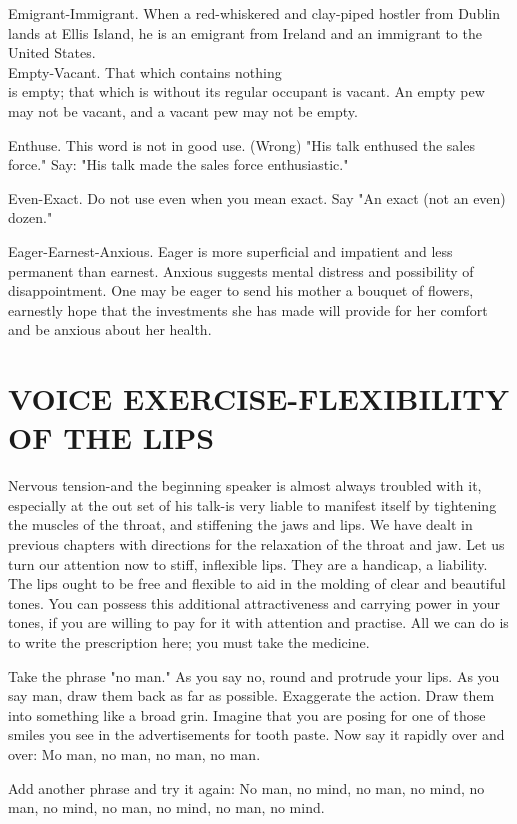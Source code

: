 \documentclass[10pt]{article}
\begin{document}
Emigrant-Immigrant. When a red-whiskered and clay-piped hostler from Dublin lands at Ellis Island, he is an emigrant from Ireland and an immigrant to the United States.\\
Empty-Vacant. That which contains nothing\\
is empty; that which is without its regular occupant is vacant. An empty pew may not be vacant, and a vacant pew may not be empty.

Enthuse. This word is not in good use. (Wrong) "His talk enthused the sales force." Say: "His talk made the sales force enthusiastic."

Even-Exact. Do not use even when you mean exact. Say "An exact (not an even) dozen."

Eager-Earnest-Anxious. Eager is more superficial and impatient and less permanent than earnest. Anxious suggests mental distress and possibility of disappointment. One may be eager to send his mother a bouquet of flowers, earnestly hope that the investments she has made will provide for her comfort and be anxious about her health.

\section*{VOICE EXERCISE-FLEXIBILITY OF THE LIPS}
Nervous tension-and the beginning speaker is almost always troubled with it, especially at the out set of his talk-is very liable to manifest itself by tightening the muscles of the throat, and stiffening the jaws and lips. We have dealt in previous chapters with directions for the relaxation of the throat and jaw. Let us turn our attention now to stiff, inflexible lips. They are a handicap, a liability. The lips ought to be free and flexible to aid in the molding of clear and beautiful tones. You can possess this additional attractiveness and carrying power in your tones, if you are willing to pay for it with attention and practise. All we can do is to write the prescription here; you must take the medicine.

Take the phrase "no man." As you say no, round and protrude your lips. As you say man, draw them back as far as possible. Exaggerate the action. Draw them into something like a broad grin. Imagine that you are posing for one of those smiles you see in the advertisements for tooth paste. Now say it rapidly over and over: Mo man, no man, no man, no man.

Add another phrase and try it again: No man, no mind, no man, no mind, no man, no mind, no man, no mind, no man, no mind.
\end{document}
